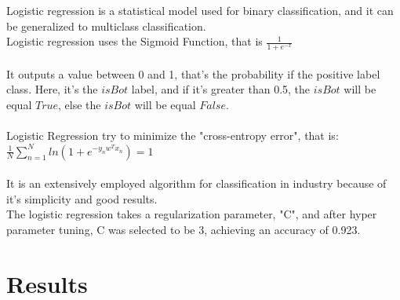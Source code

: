 \documentclass{article}
\begin{document}
    Logistic regression is a statistical model used for binary classification, and it can be generalized to multiclass classification. \\
Logistic regression uses the Sigmoid Function, that is $\frac{1}{1+e^{-x}}$\\ \\ It outputs a value between 0 and 1, that's the probability if the positive label class. Here, it's the $isBot$ label, and if it's greater than 0.5, the $isBot$ will be equal $True$, else the $isBot$ will be equal $False$.  \\ \\
Logistic Regression try to minimize the "cross-entropy error", that is:\\ $\frac{1}{N} \sum_{n=1}^{N} ln(1 + e^ {-y_{n}w^Tx_n}) = 1$\\ \\
It is an extensively employed algorithm for classification in industry because of it's simplicity and good results. \\
The logistic regression takes a regularization parameter, "C", and after hyper parameter tuning, C was selected to be 3, achieving an accuracy of 0.923. 
        
\section{Results}
    
\end{document}
